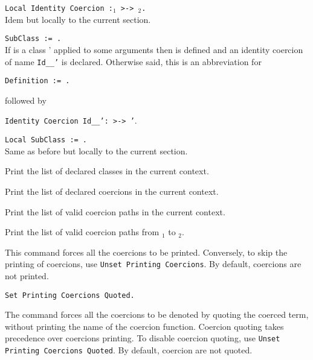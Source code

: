 \begin{Variants}
\item {\tt Local Identity Coercion {\ident}:{\ident$_1$} >-> {\ident$_2$}.} \\
Idem but locally to the current section.

\item {\tt SubClass {\ident} := {\type}.} \\
 If {\type} is a class
{\ident'} applied to some arguments then {\ident} is defined and an
identity coercion of name {\tt Id\_{\ident}\_{\ident'}} is
declared. Otherwise said, this is an abbreviation for

{\tt Definition {\ident} := {\type}.}

 followed by

{\tt Identity Coercion Id\_{\ident}\_{\ident'}:{\ident} >-> {\ident'}}.

\item {\tt Local SubClass {\ident} := {\type}.} \\
Same as before but locally to the current section.

\end{Variants}


Print the list of declared classes in the current context.

Print the list of declared coercions in the current context.

Print the list of valid coercion paths in the current context.

Print the list of valid coercion paths from {\class$_1$} to {\class$_2$}.



This command forces all the coercions to be printed.
Conversely, to skip the printing of coercions, use
 {\tt Unset Printing Coercions}.
By default, coercions are not printed.

\begin{Variants}
\item {\tt Set Printing Coercions Quoted.}

The command forces all the coercions to be denoted by quoting the coerced
term, without printing the name of the coercion function.  Coercion quoting
takes precedence over coercions printing.  To disable coercion quoting, use
  {\tt Unset Printing Coercions Quoted}.
By default, coercion are not quoted.
\end{Variants}

